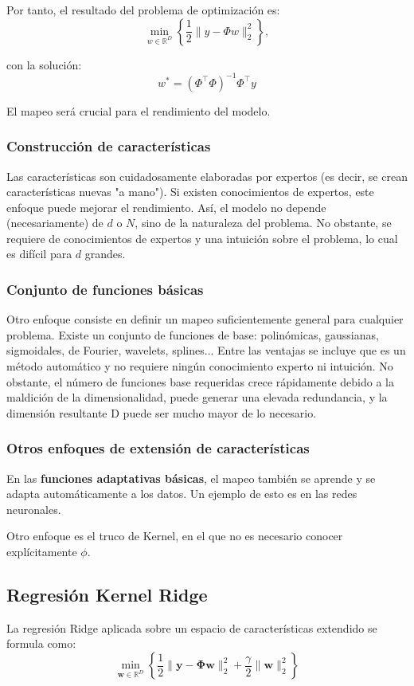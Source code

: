 Por tanto, el resultado del problema de optimización es:
$$\min_{w \in \mathbb{R}^D} \left\{ \frac{1}{2} \|y - \Phi w\|_2^2 \right\},$$

con la solución:
$$w^* = (\Phi^\top \Phi)^{-1} \Phi^\top y$$

El mapeo será crucial para el rendimiento del modelo.

\subsubsection{Construcción de características}
Las características son cuidadosamente elaboradas por expertos (es decir, se crean características nuevas "a mano"). Si existen conocimientos de expertos, este enfoque puede mejorar el rendimiento. Así, el modelo no depende (necesariamente) de $d$ o $N$, sino de la naturaleza del problema. No obstante, se requiere de conocimientos de expertos y una intuición sobre el problema, lo cual es difícil para $d$ grandes.

\subsubsection{Conjunto de funciones básicas}
Otro enfoque consiste en definir un mapeo suficientemente general para cualquier problema. Existe un conjunto de funciones de base: polinómicas, gaussianas, sigmoidales, de Fourier, wavelets, splines...
Entre las ventajas se incluye que es un método automático y no requiere ningún conocimiento experto ni intuición. No obstante, el número de funciones base requeridas crece rápidamente debido a la maldición de la dimensionalidad, puede generar una elevada redundancia, y la dimensión resultante D puede ser mucho mayor de lo necesario.

\subsubsection{Otros enfoques de extensión de características}
En las \textbf{funciones adaptativas básicas}, el mapeo también se aprende y se adapta automáticamente a los datos. Un ejemplo de esto es en las redes neuronales.

Otro enfoque es el truco de Kernel, en el que no es necesario conocer explícitamente $\phi$.

\subsection{Regresión Kernel Ridge}
La regresión Ridge aplicada sobre un espacio de características extendido se formula como:
$$\min_{\mathbf{w}\in\mathbb{R}^{D}}\left\{\frac{1}{2}\|\mathbf{y}-\mathbf{\Phi}\mathbf{w}\|_{2}^{2}+\frac{\gamma}{2}\|\mathbf{w}\|_{2}^{2}\right\}$$

